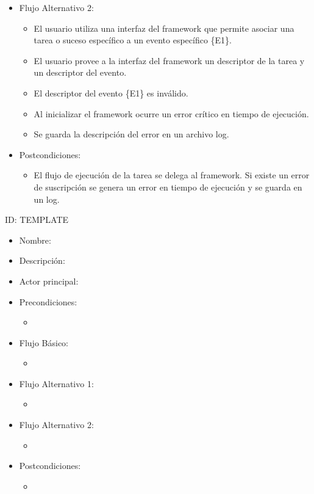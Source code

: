 \begin{itemize}
\begin{itemize}
\begin{itemize}
   		    \end{itemize}
       	\item Flujo Alternativo 2: 
       		\begin{itemize}
       		    \item El usuario utiliza una interfaz del framework que permite
       		    asociar una tarea o suceso específico a un evento específico
       		    \{E1\}.
       		    \item El usuario provee a la interfaz del framework un descriptor
       		    de la tarea y un descriptor del evento.
       		    \item El descriptor del evento \{E1\} es inválido.
       		    \item Al inicializar el framework ocurre un error crítico en tiempo
       		    de ejecución.
       		    \item Se guarda la descripción del error en un archivo log.
   		    \end{itemize}
       	\item Postcondiciones: 
       		\begin{itemize}
       		    \item  El flujo de ejecución de la tarea se delega al
       		    framework. Si existe un error de suscripción se genera un error en
       		    tiempo de ejecución y se guarda en un log.
   		    \end{itemize} 		  
    \end{itemize}

\end{itemize}

    \item ID: TEMPLATE
    \begin{itemize}
        \item Nombre:
        \item Descripción: 
       	\item Actor principal: 
       	\item Precondiciones: 
       		\begin{itemize}
       		    \item 
   		    \end{itemize}
    	\item Flujo Básico: 
       		\begin{itemize}
       		    \item 
   		    \end{itemize}
       	\item Flujo Alternativo 1: 
       		\begin{itemize}
       		    \item 
   		    \end{itemize}
       	\item Flujo Alternativo 2: 
       		\begin{itemize}
       		    \item 
   		    \end{itemize}
       	\item Postcondiciones: 
       		\begin{itemize}
       		    \item 
   		    \end{itemize} 		  
    \end{itemize}
